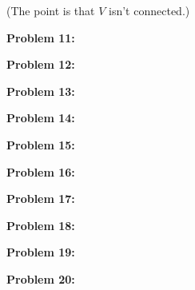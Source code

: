 \documentclass[a4paper,12pt]{article}
\begin{document}
(The point is that $V$ isn't connected.)

\shunt

{\bf Problem 11:}



\shunt

{\bf Problem 12:}

\shunt

{\bf Problem 13:}

\shunt

{\bf Problem 14:}

\shunt

{\bf Problem 15:}

\shunt

{\bf Problem 16:}

\shunt

{\bf Problem 17:}

\shunt

{\bf Problem 18:}

\shunt

{\bf Problem 19:}

\shunt

{\bf Problem 20:}

\shunt
\end{document}
